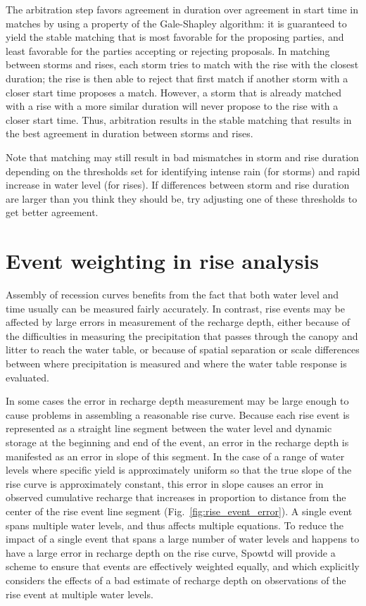 \documentclass[11pt,a4paper]{article}
\begin{document}
The arbitration step favors agreement in duration over agreement in
start time in matches by using a property of the Gale-Shapley
algorithm: it is guaranteed to yield the stable matching that is most
favorable for the proposing parties, and least favorable for the
parties accepting or rejecting proposals.  In matching between storms
and rises, each storm tries to match with the rise with the closest
duration; the rise is then able to reject that first match if another
storm with a closer start time proposes a match.  However, a storm
that is already matched with a rise with a more similar duration will
never propose to the rise with a closer start time.  Thus, arbitration
results in the stable matching that results in the best agreement in
duration between storms and rises.

Note that matching may still result in bad mismatches in storm and
rise duration depending on the thresholds set for identifying intense
rain (for storms) and rapid increase in water level (for rises).  If
differences between storm and rise duration are larger than you think
they should be, try adjusting one of these thresholds to get better
agreement.

\section{Event weighting in rise analysis}
\label{b:rise_weighting}

Assembly of recession curves benefits from the fact that both water
level and time usually can be measured fairly accurately.  In
contrast, rise events may be affected by large errors in measurement
of the recharge depth, either because of the difficulties in measuring
the precipitation that passes through the canopy and litter to reach
the water table, or because of spatial separation or scale differences
between where precipitation is measured and where the water table
response is evaluated.

In some cases the error in recharge depth measurement may be large
enough to cause problems in assembling a reasonable rise curve.
Because each rise event is represented as a straight line segment
between the water level and dynamic storage at the beginning and end
of the event, an error in the recharge depth is manifested as an error
in slope of this segment.  In the case of a range of water levels
where specific yield is approximately uniform so that the true slope
of the rise curve is approximately constant, this error in slope
causes an error in observed cumulative recharge that increases in
proportion to distance from the center of the rise event line segment
(Fig.~\ref{fig:rise_event_error}).  A single event spans multiple
water levels, and thus affects multiple equations.  To reduce the
impact of a single event that spans a large number of water levels and
happens to have a large error in recharge depth on the rise curve,
Spowtd will provide a scheme to ensure that events are effectively
weighted equally, and which explicitly considers the effects of a bad
estimate of recharge depth on observations of the rise event at
multiple water levels.
\end{document}
